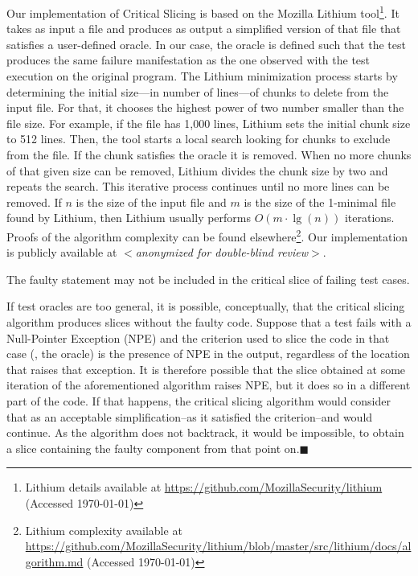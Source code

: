 \documentclass{article}
\begin{document}
Our implementation of Critical Slicing is based on the Mozilla Lithium
tool\footnote{Lithium details available at {\footnotesize\url{https://github.com/MozillaSecurity/lithium}} (Accessed \today)}. It takes as input a file
and produces as output a simplified version of that file that
satisfies a user-defined oracle. In our case, the oracle is defined
such that the test produces the same failure manifestation as the one
observed with the test execution on the original program. The
Lithium minimization process starts by determining the initial size---in
number of lines---of chunks to delete from the input file. For that,
it chooses the highest power of two number smaller than the file
size. For example, if the file has 1,000 lines, Lithium sets the
initial chunk size to 512 lines. Then, the tool starts a local search looking
for chunks to exclude from the file. If the chunk satisfies the oracle it is removed.
When no more chunks of that given size can be removed, Lithium
divides the chunk size by two and repeats the search. This iterative
process continues until no more lines can be removed.  If $n$ is the
size of the input file and $m$ is the size of the 1-minimal file found
by Lithium, then Lithium usually performs $O(m\cdot\lg(n))$
iterations. Proofs of the algorithm complexity can be found
elsewhere\footnote{Lithium complexity available at \url{https://github.com/MozillaSecurity/lithium/blob/master/src/lithium/docs/algorithm.md} (Accessed \today)}. Our implementation is publicly
available at \textit{$<$anonymized for double-blind review$>$}.

\begin{theorem}\label{the:1}
  The faulty statement may not be included in the critical slice of
  failing test cases.
\end{theorem}

If test oracles are too general, it is possible, conceptually, that
the critical slicing algorithm produces slices without the faulty
code. Suppose that a test fails with a Null-Pointer Exception (NPE)
and the criterion used to slice the code in that case (\ie{}, the
oracle) is the presence of NPE in the output, regardless of the
location that raises that exception. It is therefore possible that the
slice obtained at some iteration of the aforementioned algorithm
raises NPE, but it does so in a different part of the code. If that
happens, the critical slicing algorithm would consider that as an
acceptable simplification--as it satisfied the criterion--and would
continue. As the algorithm does not backtrack, it would be impossible,
to obtain a slice containing the faulty component from that point
on.\hfill{\tiny$\blacksquare$}
\end{document}
